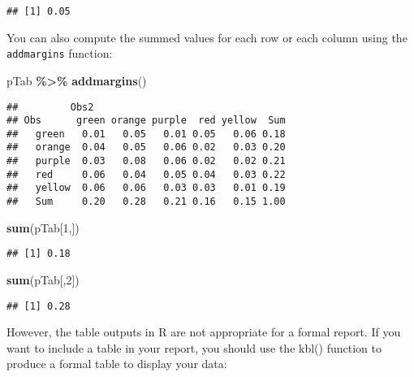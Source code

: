 \documentclass[
]{article}
\newenvironment{Shaded}{\begin{snugshade}}{\end{snugshade}}
\newcommand{\DecValTok}[1]{\textcolor[rgb]{0.00,0.00,0.81}{#1}}
\newcommand{\FunctionTok}[1]{\textcolor[rgb]{0.13,0.29,0.53}{\textbf{#1}}}
\newcommand{\NormalTok}[1]{#1}
\newcommand{\SpecialCharTok}[1]{\textcolor[rgb]{0.81,0.36,0.00}{\textbf{#1}}}
\begin{document}
\begin{verbatim}
## [1] 0.05
\end{verbatim}

You can also compute the summed values for each row or each column using
the \texttt{addmargins} function:

\begin{Shaded}
\begin{Highlighting}[]
\NormalTok{pTab }\SpecialCharTok{\%\textgreater{}\%}
  \FunctionTok{addmargins}\NormalTok{()}
\end{Highlighting}
\end{Shaded}

\begin{verbatim}
##         Obs2
## Obs      green orange purple  red yellow  Sum
##   green   0.01   0.05   0.01 0.05   0.06 0.18
##   orange  0.04   0.05   0.06 0.02   0.03 0.20
##   purple  0.03   0.08   0.06 0.02   0.02 0.21
##   red     0.06   0.04   0.05 0.04   0.03 0.22
##   yellow  0.06   0.06   0.03 0.03   0.01 0.19
##   Sum     0.20   0.28   0.21 0.16   0.15 1.00
\end{verbatim}

\begin{Shaded}
\begin{Highlighting}[]
\FunctionTok{sum}\NormalTok{(pTab[}\DecValTok{1}\NormalTok{,])}
\end{Highlighting}
\end{Shaded}

\begin{verbatim}
## [1] 0.18
\end{verbatim}

\begin{Shaded}
\begin{Highlighting}[]
\FunctionTok{sum}\NormalTok{(pTab[,}\DecValTok{2}\NormalTok{])}
\end{Highlighting}
\end{Shaded}

\begin{verbatim}
## [1] 0.28
\end{verbatim}

However, the table outputs in R are not appropriate for a formal report.
If you want to include a table in your report, you should use the kbl()
function to produce a formal table to display your data:
\end{document}
